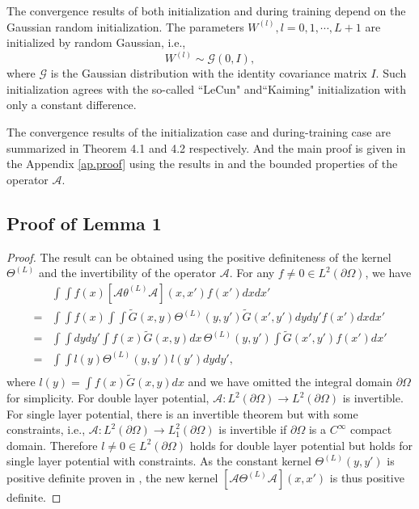 \documentclass[hyperref]{article}
\numberwithin{equation}{section}
\theoremstyle{nonumberplain}
\newtheorem{proof}{Proof}
\begin{document}
	
	
	
	
	The convergence results of both initialization and during training depend on the Gaussian random initialization. The parameters $W^{(l)},l=0,1,\cdots,L+1$ are initialized by random Gaussian, i.e., 
	\begin{equation}
		W^{(l)}\sim \mathcal{G}(0,I),
	\end{equation}
	where $\mathcal{G}$ is the Gaussian distribution with the identity covariance matrix $I$. Such initialization agrees with the so-called ``LeCun"\cite{lecun2012efficient} and``Kaiming"\cite{he2015delving} initialization with only a constant difference. 
	
	
	The convergence results of the initialization case and during-training case are summarized in Theorem 4.1 and 4.2 respectively. And the main proof is given in the Appendix \ref{ap.proof} using the results in \cite{arora2019exact}  and the bounded properties of the operator $\mathcal{A}$.
	
	
	\subsection{Proof of Lemma 1}\label{ap.definite}
	\begin{proof}
		The result can be obtained using the positive definiteness of the kernel $\Theta^{(L)}$ and the invertibility of the operator $\mathcal{A}$. 
		For any  $f\neq 0\in L^{2}(\partial\Omega)$, we have
		\begin{align*}
			&\int\int f(x) [\mathcal{A}\theta^{(L)}\mathcal{A}](x,x') f(x')dxdx' \\
			= & \int\int f(x) \int\int \tilde{G}(x,y) \Theta^{(L)}(y,y')\tilde{G}(x',y') dydy' f(x')dxdx'\\
			= & \int\int dydy' \int f(x)  \tilde{G}(x,y)dx\, \Theta^{(L)}(y,y')  \int \tilde{G}(x',y') f(x')dx'\\
			= & \int\int l(y) \Theta^{(L)}(y,y')  l(y')dydy',\\
		\end{align*}
		where $l(y) = \int f(x)  \tilde{G}(x,y)dx$ and we have omitted the integral domain $\partial\Omega$ for simplicity.  For double layer potential, $\mathcal{A}: L^{2}(\partial\Omega)\to L^{2}(\partial\Omega)$ is invertible. \cite{verchota1984layer}  For single layer potential, there is an invertible theorem but with some constraints, i.e., $\mathcal{A}: L^{2}(\partial\Omega)\to L_1^{2}(\partial\Omega)$ is invertible if $\partial\Omega$ is a $C^\infty$ compact domain. \cite{gao1991layer} 
		Therefore $l\neq 0\in L^2(\partial\Omega)$  holds for double layer potential but holds for single layer potential with constraints.  As the constant kernel $\Theta^{(L)}(y,y')$ is positive definite proven in \cite{jacot2018neural}, the new kernel $[\mathcal{A}\Theta^{(L)}\mathcal{A}](x,x')$ is thus positive definite.
	\end{proof}
	
\end{document}
